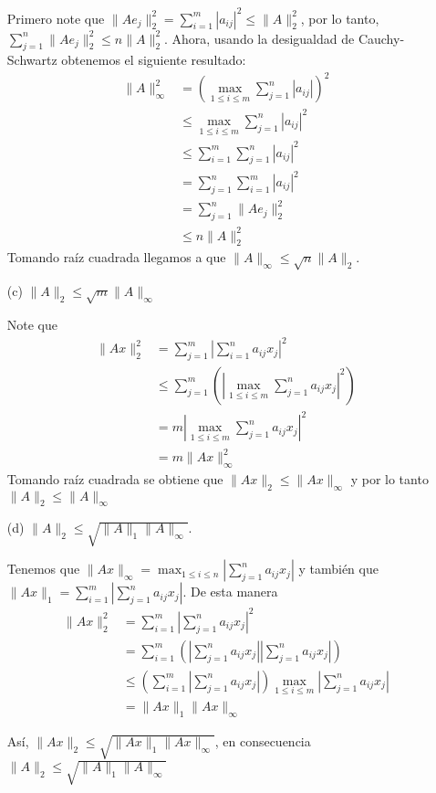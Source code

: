 \begin{enumerate}
    Primero note que $\|Ae_j\|_2^2=\sum_{i=1}^m |a_{ij}|^2\leq \|A\|_2^2$, por lo tanto, $\sum_{j=1}^n \|Ae_j\|_2^2\leq n\|A\|_2^2$. Ahora, usando la desigualdad de Cauchy-Schwartz obtenemos el siguiente resultado:
    \begin{align*}
    \|A\|_\infty^{2} & =\left(\max_{1\leq i \leq m}{\sum_{j=1}^n|a_{ij}|}\right)^2\\ 
        &\leq \max_{1\leq i \leq m}{\sum_{j=1}^n|a_{ij}|^2}\\   
        &\leq \sum_{i=1}^m\sum_{j=1}^{n}|a_{ij}|^2\\ 
        &= \sum_{j=1}^n\sum_{i=1}^{m}|a_{ij}|^2\\
        &= \sum_{j=1}^n \|Ae_j\|_2^2\\
        &\leq n\|A\|_2^2
    \end{align*}
    Tomando raíz cuadrada llegamos a que $\|A\|_\infty \leq \sqrt{n}\|A\|_2$.

    \item[(c)] $\|A\|_2 \leq \sqrt{m} \|A\|_\infty$

    Note que
    \begin{align*}
    \|Ax\|_2^2 &= \sum_{j=1}^m\left|\sum_{i=1}^n a_{ij}x_{j}\right|^2\\ 
    &\leq \sum_{j=1}^m\left(\left|\max_{1\leq i \leq m}{\sum_{j=1}^n a_{ij}x_{j}}\right|^2\right)\\ 
    &= m\left|\max_{1\leq i \leq m}{\sum_{j=1}^n a_{ij}x_{j}}\right|^2\\ 
    &= m\|Ax\|_\infty^2
    \end{align*}
    Tomando raíz cuadrada se obtiene que $\|Ax\|_2\leq \|Ax\|_\infty$ y por lo tanto $\|A\|_2 \leq \|A\|_\infty$
    \item[(d)] $\|A\|_2 \leq \sqrt{\|A\|_1 \|A\|_\infty}.$

    Tenemos que $\|Ax\|_\infty = \max_{1 \leq i \leq n}{\left|\sum_{j=1}^{n}a_{ij}x_j\right|}$ y también que $\|Ax\|_1 = \sum_{i=1}^m\left|\sum_{j=1}^{n}a_{ij}x_{j}\right|$. De esta manera
    \begin{align*}
    \|Ax\|_2^2 & = \sum_{i=1}^m\left|\sum_{j=1}^{n}a_{ij}x_{j}\right|^2 \\ 
    & = \sum_{i=1}^m\left(\left|\sum_{j=1}^{n}a_{ij}x_{j}\right|\left|\sum_{j=1}^{n}a_{ij}x_{j}\right|\right) \\ 
    &\leq \left(\sum_{i=1}^m\left|\sum_{j=1}^{n}a_{ij}x_{j}\right|\right)\max_{1\leq i \leq m}{\left|\sum_{j=1}^{n}a_{ij}x_{j}\right|} \\ 
    & = \|Ax\|_1 \|Ax\|_\infty
    \end{align*}

    Así, $\|Ax\|_2\leq \sqrt{\|Ax\|_1 \|Ax\|_\infty}$, en consecuencia $\|A\|_2 \leq \sqrt{\|A\|_1 \|A\|_\infty}$
\end{enumerate}